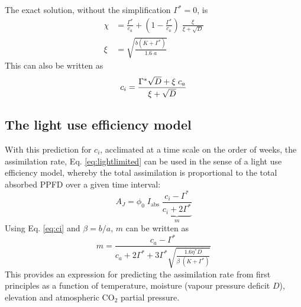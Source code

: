 \documentclass{myreport}
\begin{document}
The exact solution, without the simplification $\Gamma^{\ast}=0$, is 
\begin{align}
\label{eq:chi_exact}
    \chi &= \frac{\Gamma^{\ast}}{c_a} + \left(1- \frac{\Gamma^{\ast}}{c_a}\right)\;\frac{\xi}{\xi + \sqrt{D}}\\
    \xi &= \sqrt{\frac{b(K+\Gamma^{\ast})}{1.6\;a}}
\end{align}
This can also be written as
\begin{equation}
\label{eq:ci}
    c_i = \frac{\Gamma^{\ast}\sqrt{D}+ \xi\;c_a}{\xi + \sqrt{D}} \\ 
\end{equation}
\clearpage

\subsection{The light use efficiency model}
With this prediction for $c_i$, acclimated at a time scale on the order of weeks, the assimilation rate, Eq. \ref{eq:lightlimited} can be used in the sense of a light use efficiency model, whereby the total assimilation is proportional to the total absorbed PPFD over a given time interval:
\begin{equation}
\label{eq:lue}
        A_J = \phi_0 \; I_{\mathrm{abs}}\;\underbrace{\frac{c_i - \Gamma^{\ast}}{c_i + 2\Gamma^{\ast}}}_{m}
\end{equation}
Using Eq. \ref{eq:ci} and $\beta=b/a$, $m$ can be written as
\begin{equation}
    m = \frac{c_a - \Gamma^{\ast}}{c_a + 2 \Gamma^{\ast} + 3 \Gamma^{\ast} \sqrt{\frac{1.6 \eta^{\ast} D }{\beta\;(K+\Gamma^{\ast})}}}
\end{equation}
This provides an expression for predicting the assimilation rate from first principles as a function of temperature, moisture (vapour pressure deficit $D$), elevation and atmospheric CO$_2$ partial pressure.
\end{document}

